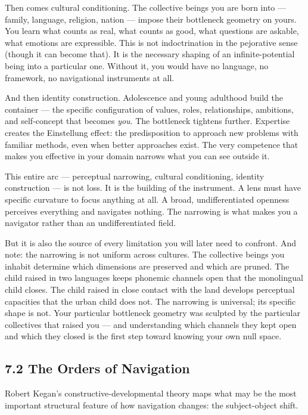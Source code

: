 Then comes cultural conditioning. The collective beings you are born into — family, language, religion, nation — impose their bottleneck geometry on yours. You learn what counts as real, what counts as good, what questions are askable, what emotions are expressible. This is not indoctrination in the pejorative sense (though it can become that). It is the necessary shaping of an infinite-potential being into a particular one. Without it, you would have no language, no framework, no navigational instruments at all.


And then identity construction. Adolescence and young adulthood build the container — the specific configuration of values, roles, relationships, ambitions, and self-concept that becomes \textit{you}. The bottleneck tightens further. Expertise creates the Einstellung effect: the predisposition to approach new problems with familiar methods, even when better approaches exist. The very competence that makes you effective in your domain narrows what you can see outside it.


This entire arc — perceptual narrowing, cultural conditioning, identity construction — is not loss. It is the building of the instrument. A lens must have specific curvature to focus anything at all. A broad, undifferentiated openness perceives everything and navigates nothing. The narrowing is what makes you a navigator rather than an undifferentiated field.


But it is also the source of every limitation you will later need to confront. And note: the narrowing is not uniform across cultures. The collective beings you inhabit determine which dimensions are preserved and which are pruned. The child raised in two languages keeps phonemic channels open that the monolingual child closes. The child raised in close contact with the land develops perceptual capacities that the urban child does not. The narrowing is universal; its specific shape is not. Your particular bottleneck geometry was sculpted by the particular collectives that raised you — and understanding which channels they kept open and which they closed is the first step toward knowing your own null space.


\subsection*{7.2 The Orders of Navigation}


Robert Kegan's constructive-developmental theory maps what may be the most important structural feature of how navigation changes: the subject-object shift.


